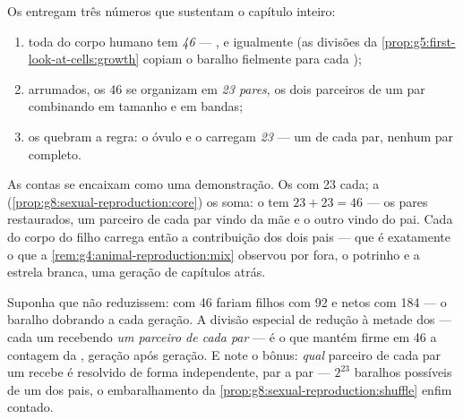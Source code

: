 \begin{proposition}\label{prop:g9:chromosomes:counts}
Os  entregam três números que sustentam o
capítulo inteiro:
\begin{enumerate}
  \item toda  do corpo humano tem \emph{46}
         --- ,  e  igualmente
        (as divisões da
        \cref{prop:g5:first-look-at-cells:growth} copiam o
        baralho fielmente para cada );
  \item arrumados, os 46 se organizam em \emph{23 pares},
        os dois parceiros de um par combinando em tamanho e
        em bandas;
  \item os \emph{} quebram a regra: o óvulo e o
         carregam \emph{23} --- um 
        de cada par, nenhum par completo.
\end{enumerate}
\end{proposition}
\admitted

\begin{example}\label{ex:g9:chromosomes:arithmetic}
As contas se encaixam como uma demonstração. Os  com
23 cada; a 
(\cref{prop:g8:sexual-reproduction:core}) os soma: o 
tem $23 + 23 = 46$ --- os pares restaurados, um parceiro de
cada par vindo da mãe e o outro vindo do pai. Cada  do
corpo do filho carrega então a contribuição dos dois pais
--- que é exatamente o que a
\cref{rem:g4:animal-reproduction:mix} observou por fora, o
potrinho e a estrela branca, uma geração de capítulos atrás.
\end{example}

\begin{remark}\label{rem:g9:chromosomes:whyhalve}
Suponha que não reduzissem:  com 46 
fariam filhos com 92 e netos com 184 --- o baralho dobrando
a cada geração. A divisão especial de redução à metade dos
 --- cada um recebendo \emph{um parceiro de cada
par} --- é o que mantém firme em 46 a contagem da ,
geração após geração. E note o bônus: \emph{qual} parceiro
de cada par um  recebe é resolvido de forma
independente, par a par --- $2^{23}$ baralhos possíveis de
um dos pais, o embaralhamento da
\cref{prop:g8:sexual-reproduction:shuffle} enfim contado.
\end{remark}

